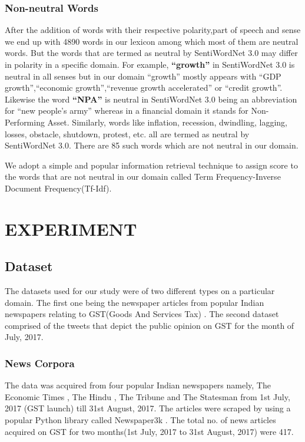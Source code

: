 \documentclass[a4paper, 10pt, conference]{ieeeconf}      %
\begin{document}
\subsubsection{Non-neutral Words}
After the addition of words with their respective polarity,part of speech and sense we end up with 4890 words in our lexicon among which most of them are neutral words. But the words that are termed as neutral by SentiWordNet 3.0 may differ in polarity in a specific domain. For example, \textbf{``growth''} in SentiWordNet 3.0 is neutral in all senses but in our domain ``growth'' mostly appears with ``GDP growth'',``economic growth'',``revenue growth accelerated'' or ``credit growth''. Likewise the word \textbf{``NPA''} is neutral in SentiWordNet 3.0 being an abbreviation for ``new people's army'' whereas in a financial domain it stands for Non-Performing Asset. Similarly, words like inflation, recession, dwindling, lagging, losses, obstacle, shutdown, protest, etc. all are termed as neutral by SentiWordNet 3.0. There are 85 such words which are not neutral in our domain.

We adopt a simple and popular information retrieval technique to assign score to the words that are not neutral in our domain called Term Frequency-Inverse Document Frequency(Tf-Idf).

\section{EXPERIMENT}

\subsection{Dataset}

The datasets used for our study were of two different types on a particular domain. The first one being the newspaper articles from popular Indian newspapers relating to GST(Goods And Services Tax) . The second dataset comprised of the tweets that depict the public opinion on GST for the month of July, 2017.

\subsubsection{News Corpora}

The data was acquired from four popular Indian newspapers namely, The Economic Times \cite{c1}, The Hindu \cite{c2}, The Tribune \cite{c3} and The Statesman \cite{c4} from  1st July, 2017 (GST launch) till 31st August, 2017. The articles were scraped by using a popular Python library called Newspaper3k \cite{c5}. The total no. of news articles acquired on GST for two months(1st July, 2017 to 31st August, 2017) were 417.
\end{document}
